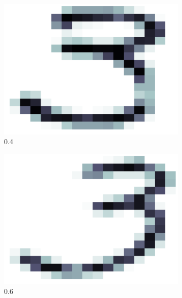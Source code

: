 \documentclass[a4paper, 10pt]{article}
\begin{document}
\begin{figure}[h]
\begin{subfigure}[t]{0.16\linewidth}
      \includegraphics[width=1\linewidth]{./lab3/PCA/PC_interpret/PC1_04.png}
      \caption{0.4}
      \label{fig:quant04}
    \end{subfigure}
    \begin{subfigure}[t]{0.16\linewidth}
      \includegraphics[width=1\linewidth]{./lab3/PCA/PC_interpret/PC1_06.png}
      \caption{0.6}
      \label{fig:quant06}
    \end{subfigure}
    \begin{subfigure}[t]{0.16\linewidth}

\end{subfigure}
\end{figure}
\end{document}
